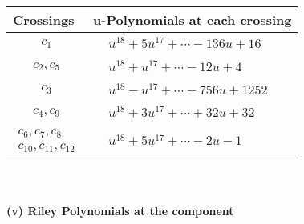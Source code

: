 \documentclass[1p]{elsarticle_modified}
\theoremstyle{definition}
\begin{document}
\begin{tabular}{m{50pt}|m{274pt}}
Crossings & \hspace{64pt}u-Polynomials at each crossing \\
\hline $$\begin{aligned}c_{1}\end{aligned}$$&$\begin{aligned}
&u^{18}+5 u^{17}+\cdots-136 u+16
\end{aligned}$\\
\hline $$\begin{aligned}c_{2},c_{5}\end{aligned}$$&$\begin{aligned}
&u^{18}+u^{17}+\cdots-12 u+4
\end{aligned}$\\
\hline $$\begin{aligned}c_{3}\end{aligned}$$&$\begin{aligned}
&u^{18}- u^{17}+\cdots-756 u+1252
\end{aligned}$\\
\hline $$\begin{aligned}c_{4},c_{9}\end{aligned}$$&$\begin{aligned}
&u^{18}+3 u^{17}+\cdots+32 u+32
\end{aligned}$\\
\hline $$\begin{aligned}c_{6},c_{7},c_{8}\\c_{10},c_{11},c_{12}\end{aligned}$$&$\begin{aligned}
&u^{18}+5 u^{17}+\cdots-2 u-1
\end{aligned}$\\
\hline
\end{tabular}\\~\\
\newpage\renewcommand{\arraystretch}{1}
\flushleft \textbf{(v) Riley Polynomials at the component}\newline \\
\end{document}
